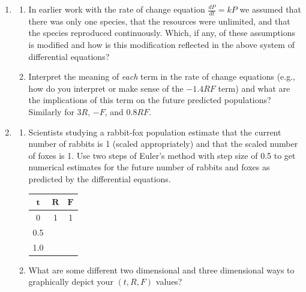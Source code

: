 \begin{enumerate}
\item \label{09problem1}
\begin{enumerate}
\item In earlier work with the rate of change equation $\frac{dP}{dt}=kP$  we assumed that there was only one species, that the resources were unlimited, and that the species reproduced continuously. Which, if any, of these assumptions is modified and how is this modification reflected in the above system of differential equations? \label{09problem1parta} \vfill

\item   Interpret the meaning of \emph{each} term in the rate of change equations (e.g., how do you interpret or make sense of the $-1.4RF$ term) and what are the implications of this term on the future predicted populations? Similarly for $3R$, $-F$, and $0.8RF$. \label{09problem1partb}
\vfill

\end{enumerate}
\item \label{09problem2}
\begin{enumerate}
\item Scientists studying a rabbit-fox population estimate that the current number of rabbits is 1 (scaled appropriately) and that the scaled number of foxes is 1. Use two steps of Euler's method with step size of 0.5 to get numerical estimates for the future number of rabbits and foxes as predicted by the differential equations. \label{09problem2parta}

\begin{tabular}{|c|c|c|}
\hline
 $\mathbf{t}$	& $\mathbf{R}$	& $\mathbf{F}$\\\hline
 0	& 1	& 1\\\hline
0.5	&&	\\\hline
1.0	&&	\\\hline		
\end{tabular}
\vfill

\item	What are some different two dimensional and three dimensional ways to graphically depict your $(t, R, F)$ values? \label{09problem2partb}

\vfill
\end{enumerate}
\end{enumerate}
\clearpage

